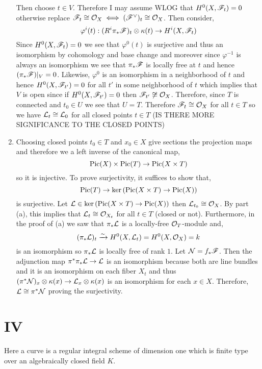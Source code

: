 \documentclass[12pt]{article}
\begin{document}
\begin{enumerate}
Then choose $t \in V$. Therefore I may assume WLOG that $H^0(X, \mathscr{F}_t) = 0$ otherwise replace $\mathscr{F}_t \cong \mathcal{O}_{X} \iff (\mathscr{F}^\vee)_t \cong \mathcal{O}_{X}$. Then consider, 
\[ \varphi^i(t) : (R^i \pi_* \mathscr{F})_t \otimes \kappa(t) \to H^i(X, \mathscr{F}_t)  \]
Since $H^0(X, \mathscr{F}_t) = 0$ we see that $\varphi^0(t)$ is surjective and thus an isomorphism by cohomology and base change and moreover since $\varphi^{-1}$ is always an isomorphism we see that $\pi_* \mathscr{F}$ is locally free at $t$ and hence $(\pi_* \mathscr{F})|_V = 0$. Likewise, $\varphi^0$ is an isomorphism in a neighborhood of $t$ and hence $H^0(X, \mathscr{F}_{t'}) = 0$ for all $t'$ in some neighborhood of $t$ which implies that $V$ is open since if $H^0(X, \mathscr{F}_{t'}) = 0$ then $\mathscr{F}_{t'} \not\cong \mathcal{O}_{X}$. Therefore, since $T$ is connected and $t_0 \in U$ we see that $U = T$. Therefore $\mathscr{F}_t \cong \mathcal{O}_{X}$ for all $t \in T$ so we have $\mathcal{L}_t \cong \mathcal{L}_0$ for all closed points $t \in T$ (IS THERE MORE SIGNIFICANCE TO THE CLOSED POINTS)

\item Choosing closed points $t_0 \in T$ and $x_0 \in X$ give sections the projection maps and therefore we a left inverse of the canonical map,
\[ \mathrm{Pic}(X) \times \mathrm{Pic}(T) \to \mathrm{Pic}(X \times T) \]
so it is injective. To prove surjectivity, it suffices to show that,
\[ \mathrm{Pic}(T) \to \ker{(\mathrm{Pic}(X \times T) \to \mathrm{Pic}(X))} \]
is surjective. Let $\mathcal{L} \in \ker{(\mathrm{Pic}(X \times T) \to \mathrm{Pic}(X))}$ then $\mathcal{L}_{t_0} \cong \mathcal{O}_{X}$. By part (a), this implies that $\mathcal{L}_t \cong \mathcal{O}_{X_t}$ for all $t \in T$ (closed or not). Furthermore, in the proof of (a) we saw that $\pi_* \mathcal{L}$ is a locally-free $\mathcal{O}_{T}$-module and,
\[ (\pi_* \mathcal{L})_t \xrightarrow{\sim} H^0(X, \mathcal{L}_t) = H^0(X, \mathcal{O}_{X}) = k \]
is an isomorphism so $\pi_* \mathcal{L}$ is locally free of rank $1$. Let $\mathcal{N} = f_* \mathscr{F}$. Then the adjunction map $\pi^* \pi_* \mathcal{L} \to \mathcal{L}$ is an isomorphism because both are line bundles and it is an isomorphism on each fiber $X_t$ and thus $(\pi^* \mathcal{N})_x \otimes \kappa(x) \to \mathcal{L}_x \otimes \kappa(x)$ is an isomorphism for each $x \in X$. Therefore, $\mathcal{L} \cong \pi^* \mathcal{N}$ proving the surjectivity. 
\end{enumerate}

\section{IV}

\begin{definition}
Here a curve is a regular integral scheme of dimension one which is finite type over an algebraically closed field $K$.
\end{definition}
\end{document}
